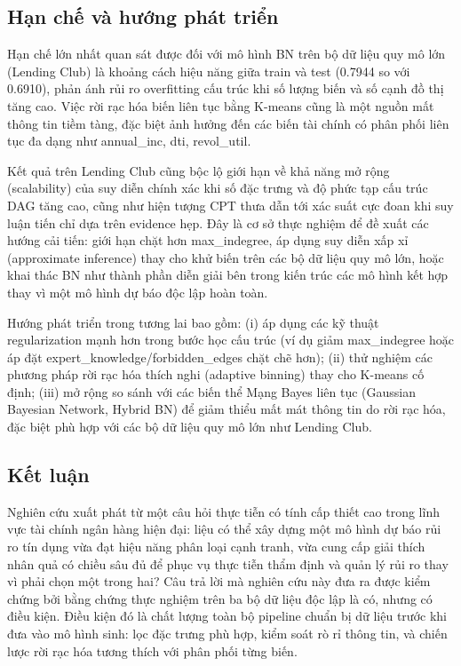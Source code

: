 \subsection{Hạn chế và hướng phát triển}
Hạn chế lớn nhất quan sát được đối với mô hình BN trên bộ dữ liệu quy mô lớn (Lending Club) là khoảng cách hiệu năng giữa train và test (0.7944 so với 0.6910), phản ánh rủi ro overfitting cấu trúc khi số lượng biến và số cạnh đồ thị tăng cao. Việc rời rạc hóa biến liên tục bằng K-means cũng là một nguồn mất thông tin tiềm tàng, đặc biệt ảnh hưởng đến các biến tài chính có phân phối liên tục đa dạng như annual\_inc, dti, revol\_util. 

Kết quả trên Lending Club cũng bộc lộ giới hạn về khả năng mở rộng (scalability) của suy diễn chính xác khi số đặc trưng và độ phức tạp cấu trúc DAG tăng cao, cũng như hiện tượng CPT thưa dẫn tới xác suất cực đoan khi suy luận tiến chỉ dựa trên evidence hẹp. Đây là cơ sở thực nghiệm để đề xuất các hướng cải tiến: giới hạn chặt hơn max\_indegree, áp dụng suy diễn xấp xỉ (approximate inference) thay cho khử biến trên các bộ dữ liệu quy mô lớn, hoặc khai thác BN như thành phần diễn giải bên trong kiến trúc các mô hình kết hợp thay vì một mô hình dự báo độc lập hoàn toàn.


Hướng phát triển trong tương lai bao gồm: (i) áp dụng các kỹ thuật regularization mạnh hơn trong bước học cấu trúc (ví dụ giảm max\_indegree hoặc áp đặt expert\_knowledge/forbidden\_edges chặt chẽ hơn); (ii) thử nghiệm các phương pháp rời rạc hóa thích nghi (adaptive binning) thay cho K-means cố định; (iii) mở rộng so sánh với các biến thể Mạng Bayes liên tục (Gaussian Bayesian Network, Hybrid BN) để giảm thiểu mất mát thông tin do rời rạc hóa, đặc biệt phù hợp với các bộ dữ liệu quy mô lớn như Lending Club.

\subsection{Kết luận}
\noindent
Nghiên cứu xuất phát từ một câu hỏi thực tiễn có tính cấp thiết cao trong lĩnh vực tài chính ngân hàng hiện đại: liệu có thể xây dựng một mô hình dự báo rủi ro tín dụng vừa đạt hiệu năng phân loại cạnh tranh, vừa cung cấp giải thích nhân quả có chiều sâu đủ để phục vụ thực tiễn thẩm định và quản lý rủi ro thay vì phải chọn một trong hai? Câu trả lời mà nghiên cứu này đưa ra được kiểm chứng bởi bằng chứng thực nghiệm trên ba bộ dữ liệu độc lập là có, nhưng có điều kiện. Điều kiện đó là chất lượng toàn bộ pipeline chuẩn bị dữ liệu trước khi đưa vào mô hình sinh: lọc đặc trưng phù hợp, kiểm soát rò rỉ thông tin, và chiến lược rời rạc hóa tương thích với phân phối từng biến.


